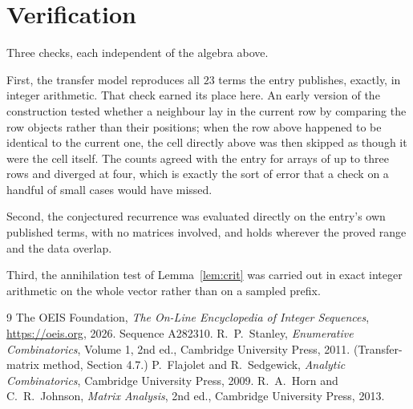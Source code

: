 \documentclass[11pt,a4paper]{article}
\theoremstyle{plain}
\theoremstyle{definition}
\begin{document}
\section{Verification}

Three checks, each independent of the algebra above.

First, the transfer model reproduces all $23$ terms the entry publishes, exactly, in
integer arithmetic. That check earned its place here. An early version of the construction
tested whether a neighbour lay in the current row by comparing the row objects rather
than their positions; when the row above happened to be identical to the current one, the
cell directly above was then skipped as though it were the cell itself. The counts agreed with
the entry for arrays of up to three rows and diverged at four, which is exactly the sort of
error that a check on a handful of small cases would have missed.

Second, the conjectured recurrence was evaluated directly on the entry's own published terms,
with no matrices involved, and holds wherever the proved range and the data overlap.

Third, the annihilation test of Lemma~\ref{lem:crit} was carried out in exact integer
arithmetic on the whole vector rather than on a sampled prefix.

\begin{thebibliography}{9}
 The OEIS Foundation, \emph{The On-Line Encyclopedia of Integer
Sequences}, \url{https://oeis.org}, 2026. Sequence A282310.
 R.~P.~Stanley, \emph{Enumerative Combinatorics}, Volume 1, 2nd ed.,
Cambridge University Press, 2011. (Transfer-matrix method, Section 4.7.)
 P.~Flajolet and R.~Sedgewick, \emph{Analytic Combinatorics}, Cambridge
University Press, 2009.
 R.~A.~Horn and C.~R.~Johnson, \emph{Matrix Analysis}, 2nd ed., Cambridge
University Press, 2013.
\end{thebibliography}
\end{document}
